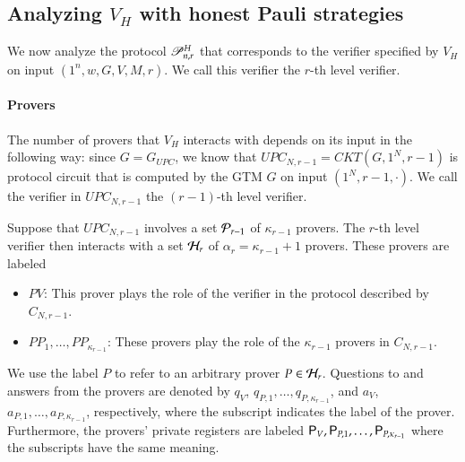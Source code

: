 \subsection{Analyzing $V_H$ with honest Pauli strategies}

We now analyze the protocol $\mathscr{P}_{n,r}^H$ that corresponds to the verifier specified by $V_H$ on input $(1^n,w,G,V,M,r)$. We call this verifier the $r$-th level verifier. 

\paragraph{Provers}
The number of provers that $V_H$ interacts with depends on its input in the following way: since $G = G_{UPC}$, we know that $UPC_{N,r-1} = CKT(G,1^N,r-1)$ is protocol circuit that is computed by the GTM $G$ on input $(1^N,r-1,\cdot)$. We call the verifier in $UPC_{N,r-1}$ the $(r-1)$-th level verifier.

Suppose that $UPC_{N,r-1}$ involves a set $\mathcal P_{r-1}$ of $\kappa_{r-1}$ provers. The $r$-th level verifier then interacts with a set $\mathcal H_r$ of $\alpha_r = \kappa_{r-1} + 1$ provers. These provers are labeled
\begin{itemize}
	\item $PV$: This prover plays the role of the verifier in the protocol described by $C_{N,r-1}$. 
	\item $PP_1,\ldots,PP_{\kappa_{r-1}}$: These provers play the role of the $\kappa_{r-1}$ provers in $C_{N,r-1}$.
\end{itemize}
We use the label $P$ to refer to an arbitrary prover $P\in\mathcal H_r$. Questions to and answers from the provers are denoted  by $q_V$, $q_{P,1},\ldots,q_{P,\kappa_{r-1}}$, and $a_V$, $a_{P,1},\ldots,a_{P,\kappa_{r-1}}$, respectively, where the subscript indicates the label of the prover. Furthermore, the provers' private registers are labeled ${\mathsf{P}}_V, {\mathsf{P}}_{P,1},\ldots,{\mathsf{P}}_{P,\kappa_{r-1}}$ where the subscripts have the same meaning.



